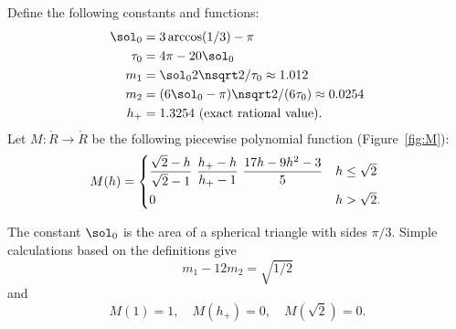 \begin{definition} 
%
%
%
%
%
%
Define the following constants and functions: 
\begin{align}\label{eqn:m-def} 
\sol_0 &= 3\arccos(1/3)-\pi\\
\tau_0 &= 4\pi  - 20\sol_0\\
m_1 &= \sol_0 2\nsqrt2/\tau_0 \approx 1.012 \\ %
m_2  &=  (6\sol_0- \pi)\nsqrt2/(6 \tau_0) \approx 0.0254\\ %
h_+ &= 1.3254 \hbox{~(exact rational value).}
\end{align}
Let $M:\ring{R}\to\ring{R}$ 
be the following piecewise polynomial function (Figure~\ref{fig:M}):
\begin{equation}\label{eqn:M} 
M(h) =
\begin{cases} 
\dfrac{\sqrt2-h}{\sqrt2-1}~%
\dfrac{h_+-h}{h_+-1} ~\dfrac{17 h - 9 h^2 - 3}{5} 
& h \le \sqrt2\vspace{3pt} \\
0 & h >\sqrt2.
\end{cases}
\\
\end{equation}
\end{definition}
%
%
%
%
%
%

\figTULIGLY %


The constant $\sol_0$
is the area of a spherical triangle with sides $\pi/3$.
Simple calculations based on the definitions give
\begin{equation}\label{eqn:km}
m_1 - 12m_2 = \sqrt{1/2}
\end{equation} 
and
\begin{equation}
M(1) = 1,\quad M(h_+)=0,\quad M(\sqrt2) =0.
\end{equation} 

